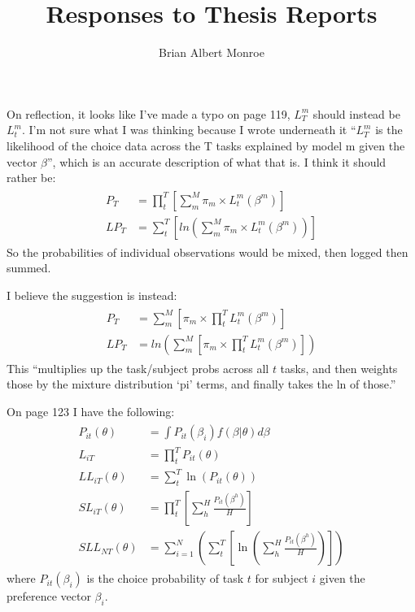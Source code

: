 \documentclass[12pt,a4paper]{article}\usepackage[]{graphicx}\usepackage[]{color}
\title{Responses to Thesis Reports}
\author{Brian Albert Monroe}
\begin{document}
\maketitle



On reflection, it looks like I've made a typo on page 119, $L_T^m$ should instead be $L_t^m$.
I'm not sure what I was thinking because I wrote underneath it \enquote{$L_T^m$ is the likelihood of the choice data across the T tasks explained by model m given the vector $\beta$}, which is an accurate description of what that is.
I think it should rather be:
\begin{align}
	\begin{split}
		P_T    &= \prod_t^T \left [ \sum_m^M \pi_m \times L_t^m(\beta^m) \right ] \\
		{LP}_T &= \sum_t^T \left [ ln \left ( \sum_m^M \pi_m \times L_t^m(\beta^m) \right ) \right ]
	\end{split}
\end{align}
So the probabilities of individual observations would be mixed, then logged then summed.

I believe the suggestion is instead:
\begin{align}
	\begin{split}
		P_T    &= \sum_m^M \left [ \pi_m \times \prod_t^T L_t^m(\beta^m) \right ] \\
		{LP}_T &= ln \left ( \sum_m^M \left [ \pi_m \times \prod_t^T L_t^m(\beta^m) \right ] \right )
	\end{split}
\end{align}
This \enquote{multiplies up the task/subject probs across all $t$ tasks, and then weights those by the mixture distribution \enquote{pi} terms, and finally takes the ln of those.}

On page 123 I have the following:
\begin{align}
	\begin{split}
		P_{it}(\theta)     &= \int P_{it}(\beta_i)f(\beta | \theta) d\beta \\
		L_{iT}             &= \prod_t^T P_{it}(\theta)                     \\
		{LL}_{iT}(\theta)  &= \sum_t^T \ln(P_{it}(\theta))                  \\
		{SL}_{iT}(\theta)  &= \prod_t^T \left [ \sum_h^H \frac{P_{it}(\beta^h)}{H}  \right] \\
		{SLL}_{NT}(\theta) &= \sum_{i=1}^N \left (  \sum_t^T  \left [ \ln \left( \sum_h^H \frac{P_{it}(\beta^h)}{H} \right ) \right] \right )
	\end{split}
\end{align}
where $P_{it}(\beta_i)$ is the choice probability of task $t$ for subject $i$ given the preference vector $\beta_i$.
\end{document}
